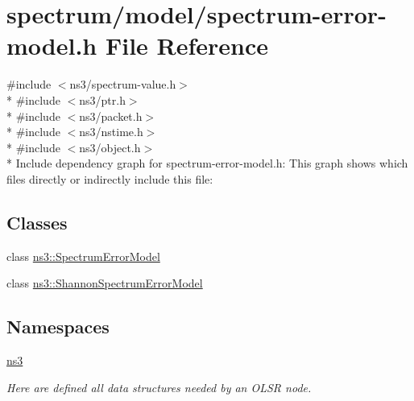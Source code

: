 \hypertarget{spectrum-error-model_8h}{}\section{spectrum/model/spectrum-\/error-\/model.h File Reference}
\label{spectrum-error-model_8h}
{\ttfamily \#include $<$ns3/spectrum-\/value.\+h$>$}\\*
{\ttfamily \#include $<$ns3/ptr.\+h$>$}\\*
{\ttfamily \#include $<$ns3/packet.\+h$>$}\\*
{\ttfamily \#include $<$ns3/nstime.\+h$>$}\\*
{\ttfamily \#include $<$ns3/object.\+h$>$}\\*
Include dependency graph for spectrum-\/error-\/model.h\+:
This graph shows which files directly or indirectly include this file\+:
\subsection*{Classes}
\begin{DoxyCompactItemize}
\item 
class \hyperlink{classns3_1_1SpectrumErrorModel}{ns3\+::\+Spectrum\+Error\+Model}
\item 
class \hyperlink{classns3_1_1ShannonSpectrumErrorModel}{ns3\+::\+Shannon\+Spectrum\+Error\+Model}
\end{DoxyCompactItemize}
\subsection*{Namespaces}
\begin{DoxyCompactItemize}
\item 
 \hyperlink{namespacens3}{ns3}
\begin{DoxyCompactList}\small\item\em Here are defined all data structures needed by an O\+L\+SR node. \end{DoxyCompactList}\end{DoxyCompactItemize}
